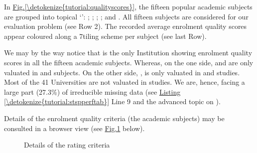 \documentclass[a4paper,12pt,english]{sphinxhowto}
\let\sphinxpxdimen\pdfpxdimen\else\newdimen\sphinxpxdimen
\begin{document}
In \hyperref[\detokenize{tutorial:qualityscores}]{Fig.\@ \ref{\detokenize{tutorial:qualityscores}}}, the fifteen popular academic subjects are grouped into topical ‘’: \sphinxhyphen{} ; \sphinxhyphen{} ; \sphinxhyphen{} ; \sphinxhyphen{} ; and \sphinxhyphen{} . All fifteen subjects are considered  for our evaluation problem (see Row 2). The recorded average enrolment quality scores appear coloured along a 7\sphinxhyphen{}tiling scheme per subject (see last Row).

We may by the way notice that  is the only Institution showing enrolment quality scores in all the fifteen academic subjects. Whereas, on the one side,  and  are only valuated in  and  subjects. On the other side, , is only valuated in  and  studies. Most of the 41 Universities are not valuated in  studies. We are, hence, facing a large part (27.3\%) of irreducible missing data (see \hyperref[\detokenize{tutorial:stspperftab}]{Listing \ref{\detokenize{tutorial:stspperftab}}} Line 9 and the advanced topic on ).

Details of the enrolment quality criteria (the academic subjects) may be consulted in a browser view (see \hyperref[\detokenize{tutorial:spiegelcriteria}]{Fig.\@ \ref{\detokenize{tutorial:spiegelcriteria}}} below).

\begin{sphinxVerbatim}[commandchars=\\\{\}]
\end{sphinxVerbatim}

\begin{figure}[H]
\centering
\capstart

\noindent\sphinxincludegraphics[width=750\sphinxpxdimen]{{spiegelCriteria}.png}
\caption{Details of the rating criteria}\label{\detokenize{tutorial:spiegelcriteria}}\end{figure}
\end{document}
